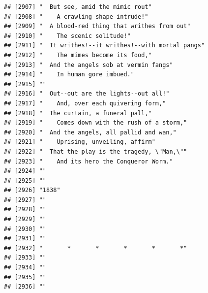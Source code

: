 \documentclass{article}\usepackage[]{graphicx}\usepackage[]{color}
\makeatletter
\newenvironment{kframe}{%
 \def\at@end@of@kframe{}%
 \ifinner\ifhmode%
  \def\at@end@of@kframe{\end{minipage}}%
  \begin{minipage}{\columnwidth}%
 \fi\fi%
 \def\FrameCommand##1{\hskip\@totalleftmargin \hskip-\fboxsep
 \colorbox{shadecolor}{##1}\hskip-\fboxsep
     \hskip-\linewidth \hskip-\@totalleftmargin \hskip\columnwidth}%
 \MakeFramed {\advance\hsize-\width
   \@totalleftmargin\z@ \linewidth\hsize
   \@setminipage}}%
 {\par\unskip\endMakeFramed%
 \at@end@of@kframe}
\newenvironment{knitrout}{}{} %
\makeatother
\begin{document}
\begin{knitrout}
\begin{kframe}
\begin{verbatim}
## [2907] "  But see, amid the mimic rout"                                              
## [2908] "    A crawling shape intrude!"                                               
## [2909] "  A blood-red thing that writhes from out"                                   
## [2910] "    The scenic solitude!"                                                    
## [2911] "  It writhes!--it writhes!--with mortal pangs"                               
## [2912] "    The mimes become its food,"                                              
## [2913] "  And the angels sob at vermin fangs"                                        
## [2914] "    In human gore imbued."                                                   
## [2915] ""                                                                            
## [2916] "  Out--out are the lights--out all!"                                         
## [2917] "    And, over each quivering form,"                                          
## [2918] "  The curtain, a funeral pall,"                                              
## [2919] "    Comes down with the rush of a storm,"                                    
## [2920] "  And the angels, all pallid and wan,"                                       
## [2921] "    Uprising, unveiling, affirm"                                             
## [2922] "  That the play is the tragedy, \"Man,\""                                    
## [2923] "    And its hero the Conqueror Worm."                                        
## [2924] ""                                                                            
## [2925] ""                                                                            
## [2926] "1838"                                                                        
## [2927] ""                                                                            
## [2928] ""                                                                            
## [2929] ""                                                                            
## [2930] ""                                                                            
## [2931] ""                                                                            
## [2932] "       *       *       *       *       *"                                    
## [2933] ""                                                                            
## [2934] ""                                                                            
## [2935] ""                                                                            
## [2936] ""                                                                            

\end{verbatim}
\end{kframe}
\end{knitrout}
\end{document}
